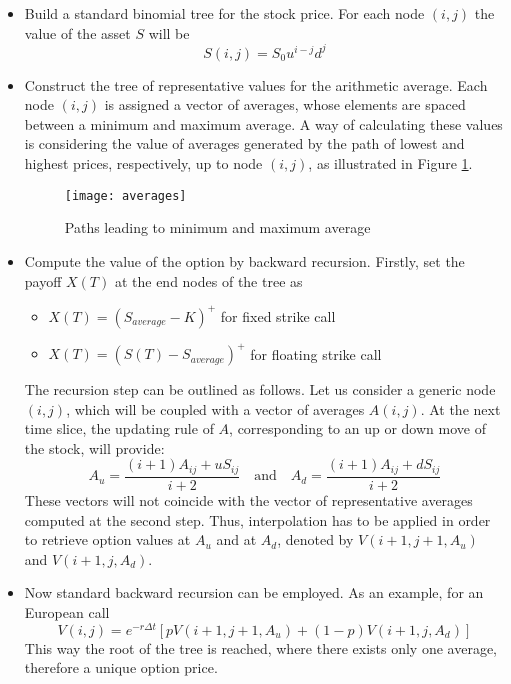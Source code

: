 \documentclass[12pt]{article}
\numberwithin{equation}{section}
\begin{document}
\begin{itemize}
\item Build a standard binomial tree for the stock price. For each node $(i,j)$ the value of the asset $S$ will be
\begin{equation*}
S(i,j) = S_0u^{i-j}d^j
\end{equation*}
\item Construct the tree of representative values for the arithmetic average. Each node $(i,j)$ is assigned a vector of averages, whose elements are spaced between a minimum and maximum average. A way of calculating these values is considering the value of averages generated by the path of lowest and highest prices, respectively, up to node $(i,j)$, as illustrated in Figure \ref{averages}.
\begin{figure}[h]
	\centering
	\texttt{[image: averages]}
	\caption{Paths leading to minimum and maximum average}
	\label{averages}
\end{figure}
\item Compute the value of the option by backward recursion. Firstly, set the payoff $X(T)$ at the end nodes of the tree as
\begin{itemize}
\item $X(T) = (S_{average}-K)^+$ for fixed strike call
\item $X(T) = (S(T)-S_{average})^+$ for floating strike call
\end{itemize}
The recursion step can be outlined as follows. Let us consider a generic node $(i,j)$, which will be coupled with a vector of averages $A(i,j)$. At the next time slice, the updating rule of $A$, corresponding to an up or down move of the stock, will provide:
\begin{equation*}
A_{u} = \frac{(i+1)A_{ij} + uS_{ij}}{i+2} \quad \text{and} \quad A_{d} = \frac{(i+1)A_{ij} + dS_{ij}}{i+2}
\end{equation*}
These vectors will not coincide with the vector of representative averages computed at the second step. Thus, interpolation has to be applied in order to retrieve option values at $A_{u}$ and at $A_{d}$, denoted by $V(i+1,j+1,A_{u})$ and $V(i+1,j,A_{d})$.
\item Now standard backward recursion can be employed. As an example, for an European call
\begin{equation*}
V(i,j) = e^{-r\Delta t}[pV(i+1,j+1,A_{u}) + (1-p)V(i+1,j,A_{d})]
\end{equation*}
This way the root of the tree is reached, where there exists only one average, therefore a unique option price.
\end{itemize}
\end{document}
